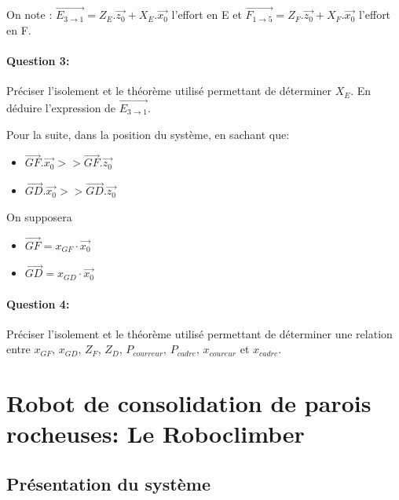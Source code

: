 On note : $\overrightarrow{E_{3 \rightarrow 1}}=Z_E.\overrightarrow{z_0}+X_E.\overrightarrow{x_0}$ l'effort en E et $\overrightarrow{F_{1 \rightarrow 5}}=Z_F.\overrightarrow{z_0}+X_F.\overrightarrow{x_0}$ l'effort en F.

\paragraph{Question 3:} Préciser l'isolement et le théorème utilisé permettant de déterminer $X_E$. En déduire l'expression de $\overrightarrow{E_{3 \rightarrow 1}}$.

Pour la suite, dans la position du système, en sachant que:
\begin{itemize}
 \item $\overrightarrow{GF}.\overrightarrow{x_0}>>\overrightarrow{GF}.\overrightarrow{z_0}$
 \item $\overrightarrow{GD}.\overrightarrow{x_0}>>\overrightarrow{GD}.\overrightarrow{z_0}$
\end{itemize}

On supposera 
\begin{itemize}
 \item $\overrightarrow{GF}=x_{GF}\cdot\overrightarrow{x_0}$
 \item $\overrightarrow{GD}=x_{GD}\cdot\overrightarrow{x_0}$
\end{itemize}


\paragraph{Question 4:} Préciser l'isolement et le théorème utilisé permettant de déterminer une relation entre $x_{GF}$, $x_{GD}$, $Z_F$, $Z_D$, $P_{courreur}$, $P_{cadre}$, $x_{coureur}$ et $x_{cadre}$.

\newpage

\section{Robot de consolidation de parois rocheuses: Le \og Roboclimber \fg}

\subsection{Présentation du système}

